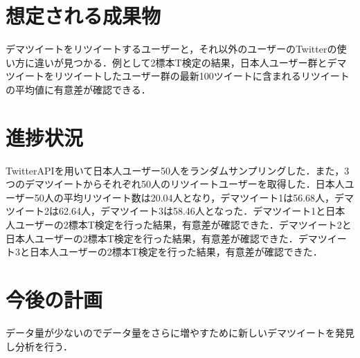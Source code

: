 \documentclass[uplatex,twocolumn,dvipdfmx]{jsarticle}
\begin{document}
\section{想定される成果物}
デマツイートをリツイートするユーザーと，それ以外のユーザーのTwitterの使い方に違いが見つかる．例として2標本T検定の結果，日本人ユーザー群とデマツイートをリツイートしたユーザー群の最新100ツイートに含まれるリツイートの平均値に有意差が確認できる．

\section{進捗状況}
TwitterAPIを用いて日本人ユーザー50人をランダムサンプリングした．また，3つのデマツイートからそれぞれ50人のリツイートユーザーを取得した．日本人ユーザー50人の平均リツイート数は20.04人となり，デマツイート1は56.68人，デマツイート2は62.64人，デマツイート3は58.46人となった．デマツイート1と日本人ユーザーの2標本T検定を行った結果，有意差が確認できた．デマツイート2と日本人ユーザーの2標本T検定を行った結果，有意差が確認できた．デマツイート3と日本人ユーザーの2標本T検定を行った結果，有意差が確認できた．

\section{今後の計画}
データ量が少ないのでデータ量をさらに増やすために新しいデマツイートを発見し分析を行う．


\end{document}
